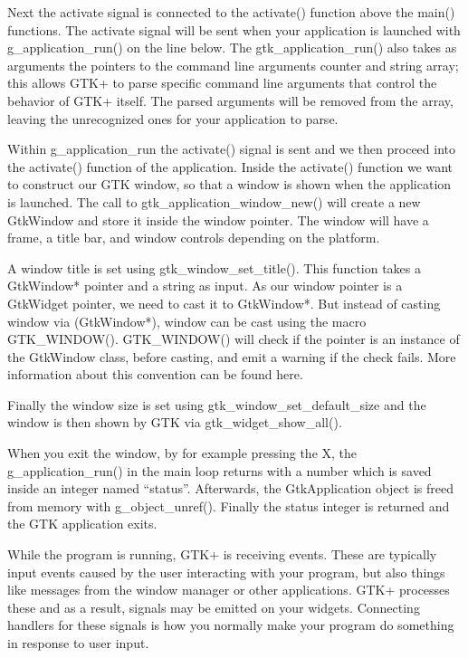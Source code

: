 \documentclass[a4paper,openany,twoside,final]{book}
\begin{document}
Next the activate signal is connected to the activate() function above the main() functions. The activate signal will be sent when your application is launched with g\_application\_run() on the line below. The gtk\_application\_run() also takes as arguments the pointers to the command line arguments counter and string array; this allows GTK+ to parse specific command line arguments that control the behavior of GTK+ itself. The parsed arguments will be removed from the array, leaving the unrecognized ones for your application to parse.

Within g\_application\_run the activate() signal is sent and we then proceed into the activate() function of the application. Inside the activate() function we want to construct our GTK window, so that a window is shown when the application is launched. The call to gtk\_application\_window\_new() will create a new GtkWindow and store it inside the window pointer. The window will have a frame, a title bar, and window controls depending on the platform.

A window title is set using gtk\_window\_set\_title(). This function takes a GtkWindow* pointer and a string as input. As our window pointer is a GtkWidget pointer, we need to cast it to GtkWindow*. But instead of casting window via (GtkWindow*), window can be cast using the macro GTK\_WINDOW(). GTK\_WINDOW() will check if the pointer is an instance of the GtkWindow class, before casting, and emit a warning if the check fails. More information about this convention can be found here.

Finally the window size is set using gtk\_window\_set\_default\_size and the window is then shown by GTK via gtk\_widget\_show\_all().

When you exit the window, by for example pressing the X, the g\_application\_run() in the main loop returns with a number which is saved inside an integer named ``status''. Afterwards, the GtkApplication object is freed from memory with g\_object\_unref(). Finally the status integer is returned and the GTK application exits.

While the program is running, GTK+ is receiving events. These are typically input events caused by the user interacting with your program, but also things like messages from the window manager or other applications. GTK+ processes these and as a result, signals may be emitted on your widgets. Connecting handlers for these signals is how you normally make your program do something in response to user input.
\end{document}
